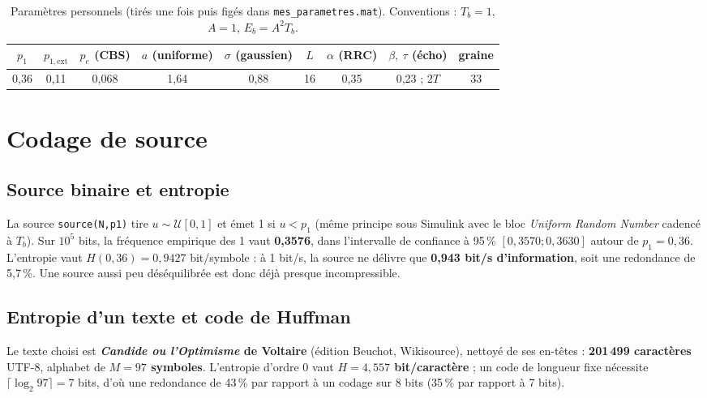 \documentclass[10pt,a4paper]{article}
\newcommand{\code}[1]{\texttt{\small #1}}
\newcommand{\bloc}[1]{\textit{#1}}
\begin{document}
\begin{table}[H]
\centering\small
\begin{tabular}{ccccccccc}
\toprule
$p_1$ & $p_{1,\mathrm{ext}}$ & $p_e$ (CBS) & $a$ (uniforme) & $\sigma$ (gaussien) & $L$ & $\alpha$ (RRC) & $\beta,\ \tau$ (écho) & graine \\
\midrule
0,36 & 0,11 & 0,068 & 1,64 & 0,88 & 16 & 0,35 & 0,23 ; $2T$ & 33 \\
\bottomrule
\end{tabular}
\caption{Paramètres personnels (tirés une fois puis figés dans \code{mes\_parametres.mat}). Conventions : $T_b=1$, $A=1$, $E_b=A^2T_b$.}
\label{tab:param}
\end{table}

\section{Codage de source}
\subsection{Source binaire et entropie}
La source \code{source(N,p1)} tire $u\sim\mathcal U[0,1]$ et émet 1 si $u<p_1$ (même principe sous Simulink avec le bloc \bloc{Uniform Random Number} cadencé à $T_b$). Sur $10^5$ bits, la fréquence empirique des 1 vaut \textbf{0,3576}, dans l'intervalle de confiance à 95\,\% $[0,3570 ; 0,3630]$ autour de $p_1=0,36$. L'entropie vaut $H(0,36) = 0,9427$ bit/symbole : à 1 bit/s, la source ne délivre que \textbf{0,943 bit/s d'information}, soit une redondance de 5,7\,\%. Une source aussi peu déséquilibrée est donc déjà presque incompressible.

\subsection{Entropie d'un texte et code de Huffman}
Le texte choisi est \textbf{\textit{Candide ou l'Optimisme} de Voltaire} (édition Beuchot, Wikisource), nettoyé de ses en-têtes : \textbf{201\,499 caractères} UTF-8, alphabet de \textbf{$M = 97$ symboles}. L'entropie d'ordre 0 vaut \textbf{$H = 4,557$ bit/caractère} ; un code de longueur fixe nécessite $\lceil\log_2 97\rceil = 7$ bits, d'où une redondance de 43\,\% par rapport à un codage sur 8 bits (35\,\% par rapport à 7 bits).
\end{document}
